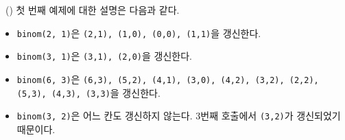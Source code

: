 \begin{problem}{\kcpcpprobbinom\ (\kcpcpprobbinomshort)}
    \Explanation
    첫 번째 예제에 대한 설명은 다음과 같다.
    \begin{itemize}
        \item \verb|binom(2, 1)|은 \verb|(2,1), (1,0), (0,0), (1,1)|을 갱신한다.
        \item \verb|binom(3, 1)|은 \verb|(3,1), (2,0)|을 갱신한다.
        \item \verb|binom(6, 3)|은 \verb|(6,3), (5,2), (4,1), (3,0), (4,2), (3,2), (2,2), (5,3), (4,3), (3,3)|을 갱신한다.
        \item \verb|binom(3, 2)|은 어느 칸도 갱신하지 않는다. 3번째 호출에서 \verb|(3,2)|가 갱신되었기 때문이다.
    \end{itemize}

\end{problem}


